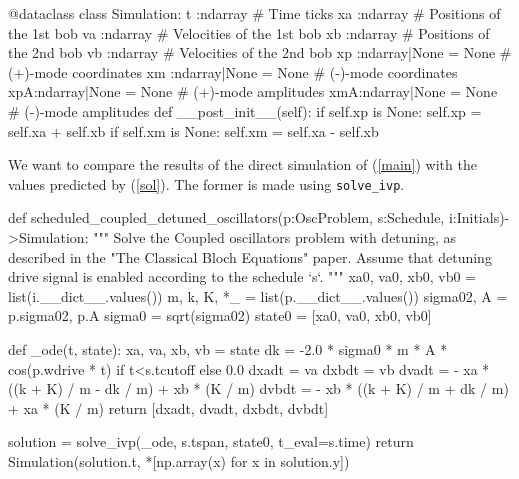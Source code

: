   \begin{python}
  @dataclass
  class Simulation:
    t  :ndarray               # Time ticks
    xa :ndarray               # Positions of the 1st bob
    va :ndarray               # Velocities of the 1st bob
    xb :ndarray               # Positions of the 2nd bob
    vb :ndarray               # Velocities of the 2nd bob
    xp :ndarray|None = None   # (+)-mode coordinates
    xm :ndarray|None = None   # (-)-mode coordinates
    xpA:ndarray|None = None   # (+)-mode amplitudes
    xmA:ndarray|None = None   # (-)-mode amplitudes
    def __post_init__(self):
      if self.xp is None:
        self.xp = self.xa + self.xb
      if self.xm is None:
        self.xm = self.xa - self.xb
  \end{python}

We want to compare the results of the direct simulation of (\ref{main}) with the values predicted by
(\ref{sol}). The former is made using \verb|solve_ivp|.

  \begin{python}
  def scheduled_coupled_detuned_oscillators(p:OscProblem, s:Schedule, i:Initials)->Simulation:
    """ Solve the Coupled oscillators problem with detuning, as described in the "The Classical Bloch
    Equations" paper. Assume that detuning drive signal is enabled according to the schedule `s`.
    """
    xa0, va0, xb0, vb0 = list(i.__dict__.values())
    m, k, K, *_ = list(p.__dict__.values())
    sigma02, A = p.sigma02, p.A
    sigma0 = sqrt(sigma02)
    state0 = [xa0, va0, xb0, vb0]
  
    def _ode(t, state):
      xa, va, xb, vb = state
      dk = -2.0 * sigma0 * m * A * cos(p.wdrive * t) if t<s.tcutoff else 0.0
      dxadt = va
      dxbdt = vb
      dvadt = - xa * ((k + K) / m - dk / m) + xb * (K / m)
      dvbdt = - xb * ((k + K) / m + dk / m) + xa * (K / m)
      return [dxadt, dvadt, dxbdt, dvbdt]
  
    solution = solve_ivp(_ode, s.tspan, state0, t_eval=s.time)
    return Simulation(solution.t, *[np.array(x) for x in solution.y])
  \end{python}

